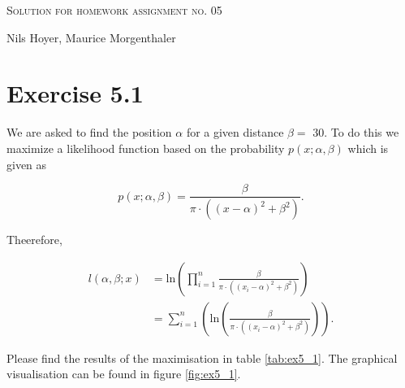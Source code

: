 \documentclass[10pt]{article}
\newenvironment{myfont}{\fontfamily{put}\selectfont}{\par}
\begin{document}
\begin{myfont}

\begin{center}
  \begin{Large}
    \textsc{Solution for homework assignment no. 05} \\
  \end{Large}
	\vspace*{0.4cm}
    Nils Hoyer, Maurice Morgenthaler
  \vspace*{1cm}
\end{center}

\section*{Exercise 5.1}


We are asked to find the position $\alpha$ for a given distance $\beta =$ \num{30}.
To do this we maximize a likelihood function based on the probability $p(x;\alpha, \beta)$ which is given as

\begin{equation}
  p(x; \alpha, \beta) = \frac{\beta}{\pi \cdot\left(\left(x - \alpha\right)^{2} + \beta^{2}\right)}.
\end{equation}

\noindent Theerefore,

\begin{align*}
  l(\alpha, \beta; x) & = \textrm{ln}\left(\prod_{i = 1}^{n}\frac{\beta}{\pi \cdot\left(\left(x_{i} - \alpha\right)^{2} + \beta^{2}\right)}\right) \\
                      & = \sum_{i = 1}^{n}\left(\textrm{ln}\left(\frac{\beta}{\pi \cdot\left(\left(x_{i} - \alpha\right)^{2} + \beta^{2}\right)}\right)\right).
\end{align*}

\noindent Please find the results of the maximisation in table \ref{tab:ex5_1}.
The graphical visualisation can be found in figure \ref{fig:ex5_1}.


\end{myfont}
\end{document}
